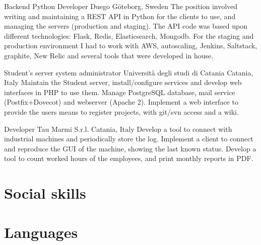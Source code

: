 \documentclass[11pt,a4paper,sans]{moderncv} %
\begin{document}
    {Backend Python Developer}
    {Duego}
    {G\"{o}teborg, Sweden}
    {}
    {
        The position involved writing and maintaining a REST API in Python for the clients to use, and managing the servers (production and staging).
        \newline
        The API code was based upon different technologies: Flask, Redis, Elasticsearch, Mongodb.
        \newline
        For the staging and production environment I had to work with AWS, autoscaling, Jenkins, Saltstack, graphite, New Relic and several tools that were developed in house.
    }

    {Student's server system administrator}
    {Universit\`{a} degli studi di Catania}
    {Catania, Italy}
    {}
    {Maintain the Student server, install/configure services and develop web interfaces in PHP to use them.
    \newline
    Manage PostgreSQL database, mail service (Postfix+Dovecot) and webserver (Apache 2).
    \newline
    Implement a web interface to provide the users means to register projects, with git/svn access and a wiki.
    }

    {Developer}
    {Tau Marmi S.r.l.}
    {Catania, Italy}
    {}
    {Develop a tool to connect with industrial machines and periodically store the log. Implement a client to connect and reproduce the GUI of the machine, showing the last known status.
    \newline
    Develop a tool to count worked hours of the employees, and print monthly reports in PDF.}


\section{Social skills}


\section{Languages}

\end{document}
